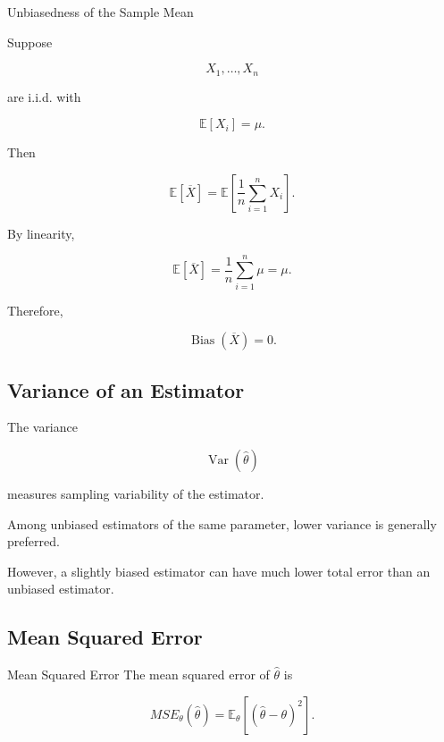 \begin{workedexamplebox}{Unbiasedness of the Sample Mean}

Suppose

\[
X_1,\ldots,X_n
\]

are i.i.d. with

\[
\mathbb{E}[X_i]=\mu.
\]

Then

\[
\mathbb{E}[\overline{X}]
=
\mathbb{E}
\left[
\frac1n
\sum_{i=1}^{n}
X_i
\right].
\]

By linearity,

\[
\mathbb{E}[\overline{X}]
=
\frac1n
\sum_{i=1}^{n}
\mu
=
\mu.
\]

Therefore,

\begin{answerbox}
\[
\boxed{
\operatorname{Bias}(\overline{X})=0.
}
\]
\end{answerbox}

\end{workedexamplebox}

\subsection{Variance of an Estimator}
\label{subsec:variance-estimator}

The variance

\[
\boxed{
\operatorname{Var}
(
\widehat{\theta}
)
}
\]

measures sampling variability of the estimator.

Among unbiased estimators of the same parameter, lower variance is
generally preferred.

However, a slightly biased estimator can have much lower total error than
an unbiased estimator.

\subsection{Mean Squared Error}
\label{subsec:mean-squared-error}

\begin{definitionbox}{Mean Squared Error}
The mean squared error of \(\widehat{\theta}\) is

\[
\boxed{
MSE_\theta
(
\widehat{\theta}
)
=
\mathbb{E}_\theta
[
(
\widehat{\theta}
-
\theta
)^2
].
}
\]
\end{definitionbox}

